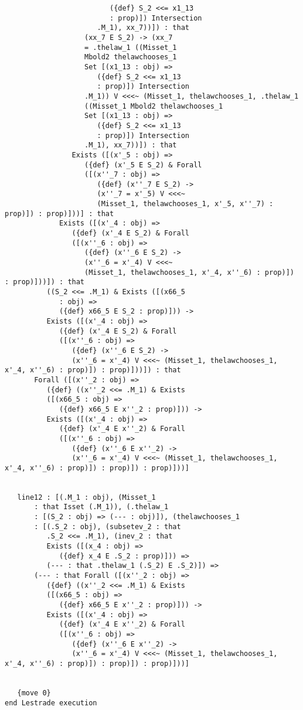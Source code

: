 \documentclass{article}
\begin{document}
\begin{verbatim}
                         ({def} S_2 <<= x1_13 
                         : prop)]) Intersection 
                      .M_1), xx_7))]) : that 
                   (xx_7 E S_2) -> (xx_7 
                   = .thelaw_1 ((Misset_1 
                   Mbold2 thelawchooses_1 
                   Set [(x1_13 : obj) => 
                      ({def} S_2 <<= x1_13 
                      : prop)]) Intersection 
                   .M_1)) V <<<~ (Misset_1, thelawchooses_1, .thelaw_1 
                   ((Misset_1 Mbold2 thelawchooses_1 
                   Set [(x1_13 : obj) => 
                      ({def} S_2 <<= x1_13 
                      : prop)]) Intersection 
                   .M_1), xx_7))]) : that 
                Exists ([(x'_5 : obj) => 
                   ({def} (x'_5 E S_2) & Forall 
                   ([(x''_7 : obj) => 
                      ({def} (x''_7 E S_2) -> 
                      (x''_7 = x'_5) V <<<~ 
                      (Misset_1, thelawchooses_1, x'_5, x''_7) : prop)]) : prop)]))] : that 
             Exists ([(x'_4 : obj) => 
                ({def} (x'_4 E S_2) & Forall 
                ([(x''_6 : obj) => 
                   ({def} (x''_6 E S_2) -> 
                   (x''_6 = x'_4) V <<<~ 
                   (Misset_1, thelawchooses_1, x'_4, x''_6) : prop)]) : prop)]))]) : that 
          ((S_2 <<= .M_1) & Exists ([(x66_5 
             : obj) => 
             ({def} x66_5 E S_2 : prop)])) -> 
          Exists ([(x'_4 : obj) => 
             ({def} (x'_4 E S_2) & Forall 
             ([(x''_6 : obj) => 
                ({def} (x''_6 E S_2) -> 
                (x''_6 = x'_4) V <<<~ (Misset_1, thelawchooses_1, x'_4, x''_6) : prop)]) : prop)]))]) : that 
       Forall ([(x''_2 : obj) => 
          ({def} ((x''_2 <<= .M_1) & Exists 
          ([(x66_5 : obj) => 
             ({def} x66_5 E x''_2 : prop)])) -> 
          Exists ([(x'_4 : obj) => 
             ({def} (x'_4 E x''_2) & Forall 
             ([(x''_6 : obj) => 
                ({def} (x''_6 E x''_2) -> 
                (x''_6 = x'_4) V <<<~ (Misset_1, thelawchooses_1, x'_4, x''_6) : prop)]) : prop)]) : prop)]))]


   line12 : [(.M_1 : obj), (Misset_1 
       : that Isset (.M_1)), (.thelaw_1 
       : [(S_2 : obj) => (--- : obj)]), (thelawchooses_1 
       : [(.S_2 : obj), (subsetev_2 : that 
          .S_2 <<= .M_1), (inev_2 : that 
          Exists ([(x_4 : obj) => 
             ({def} x_4 E .S_2 : prop)])) => 
          (--- : that .thelaw_1 (.S_2) E .S_2)]) => 
       (--- : that Forall ([(x''_2 : obj) => 
          ({def} ((x''_2 <<= .M_1) & Exists 
          ([(x66_5 : obj) => 
             ({def} x66_5 E x''_2 : prop)])) -> 
          Exists ([(x'_4 : obj) => 
             ({def} (x'_4 E x''_2) & Forall 
             ([(x''_6 : obj) => 
                ({def} (x''_6 E x''_2) -> 
                (x''_6 = x'_4) V <<<~ (Misset_1, thelawchooses_1, x'_4, x''_6) : prop)]) : prop)]) : prop)]))]


   {move 0}
end Lestrade execution
\end{verbatim}
\end{document}

